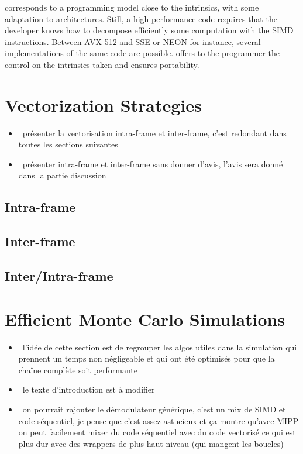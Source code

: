 \MIPP corresponds to a programming model close to the intrinsics, with some
adaptation to architectures. Still, a high performance code requires that the
developer knows how to decompose efficiently some computation with the SIMD
instructions. Between AVX-512 and SSE or NEON for instance, several
implementations of the same code are possible. \MIPP offers to the programmer
the control on the intrinsics taken and ensures portability.

\section{Vectorization Strategies}
\label{sec:opt_vec_strat}

\begin{itemize}
  \item \xmark~présenter la vectorisation intra-frame et inter-frame, c'est
    redondant dans toutes les sections suivantes
  \item \xmark~présenter intra-frame et inter-frame sans donner d'avis, l'avis
    sera donné dans la partie discussion
\end{itemize}

\subsection{Intra-frame}
\label{sec:opt_vec_strat_intra}

\subsection{Inter-frame}
\label{sec:opt_vec_strat_inter}

\subsection{Inter/Intra-frame}

\section{Efficient Monte Carlo Simulations}

\begin{itemize}
  \item \cmark~l'idée de cette section est de regrouper les algos utiles dans la
    simulation qui prennent un temps non négligeable et qui ont été optimisés
    pour que la chaîne complète soit performante
  \item \xmark~le texte d'introduction est à modifier
  \item \xmark~on pourrait rajouter le démodulateur générique, c'est un mix de
    SIMD et code séquentiel, je pense que c'est assez astucieux et ça montre
    qu'avec MIPP on peut facilement mixer du code séquentiel avec du code
    vectorisé ce qui est plus dur avec des wrappers de plus haut niveau (qui
    mangent les boucles)
\end{itemize}

